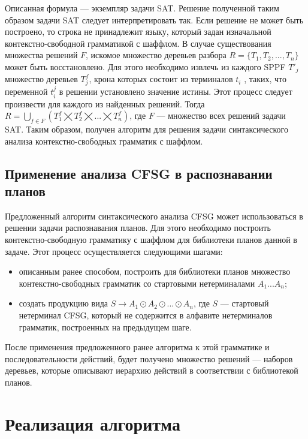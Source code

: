 \documentclass[14pt]{matmex-diploma-custom}
\begin{document}
	Описанная формула --- экземпляр задачи SAT. Решение полученной таким образом задачи SAT следует интерпретировать так.
	Если решение не может быть построено, то строка не принадлежит языку, который задан изначальной
	контекстно-свободной грамматикой с шаффлом. В случае существования множества решений $F$, 
	искомое множество деревьев разбора $R = \{T_1, T_2, ..., T_n\}$ может быть восстановлено. Для этого необходимо 
	извлечь из каждого SPPF $T'_j$ множество деревьев $T_j^f$, крона которых состоит из терминалов $t_i$ , таких, что 
	переменной $t_i^j $ в решении установлено значение истины. Этот процесс следует произвести для каждого из найденных решений.
	Тогда $R = \bigcup\limits_{f\in F} (T_1^f \bigtimes T_2^f \bigtimes ... \bigtimes T_n^f)$, где $F$ --- множество всех решений задачи SAT.
	Таким образом, получен алгоритм для решения задачи синтаксического анализа контекстно-свободных грамматик с шаффлом.
	
	\subsection{Применение анализа CFSG в распознавании планов}
	
	Предложенный алгоритм синтаксического анализа CFSG может использоваться в решении задачи распознавания планов.
	Для этого необходимо построить контекстно-свободную грамматику с шаффлом для библиотеки планов данной в задаче.
	Этот процесс осуществляется следующими шагами: 
	\begin{itemize}
		\item описанным ранее способом, построить для библиотеки планов множество контекстно-свободных грамматик со стартовыми нетерминалами $A_1...A_n$;
		\item создать продукцию вида $S \rightarrow A_1 \odot A_2 \odot ... \odot A_n$, где $S$ --- стартовый нетерминал CFSG, который не содержится в алфавите нетерминалов грамматик, построенных на предыдущем шаге.
	\end{itemize}

	После применения предложенного ранее алгоритма к этой грамматике и последовательности действий, будет получено множество решений ---
	наборов деревьев, которые описывают иерархию действий в соответствии с библиотекой планов.
	
	
	
	
	\section{Реализация алгоритма}
    
\end{document}
